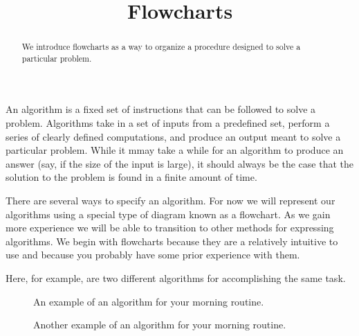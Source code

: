 \documentclass{ximera}
\title{Flowcharts}
\begin{document}
  
\begin{abstract}  
We introduce flowcharts as a way to organize a procedure designed to solve a particular problem.
\end{abstract}  
\maketitle

An algorithm is a fixed set of instructions that can be followed to solve a problem. Algorithms take in a set of inputs from a predefined set, perform a series of clearly defined computations, and produce an output meant to solve a particular problem. While it mmay take a while for an algorithm to produce an answer (say, if the size of the input is large), it should always be the case that the solution to the problem is found in a finite amount of time.


There are several ways to specify an algorithm. For now we will represent our algorithms using a special type of diagram known as a flowchart. As we gain more experience we will be able to transition to other methods for expressing algorithms. We begin with flowcharts because they are a relatively intuitive to use and because you probably have some prior experience with them.


Here, for example, are two different algorithms for accomplishing the same task. 

\begin{figure}[!ht]
	\centering
	\caption{An example of an algorithm for your morning routine.}
\end{figure}

\begin{figure}[!ht]
	\centering
	\caption{Another example of an algorithm for your morning routine.}
\end{figure}
\end{document}

